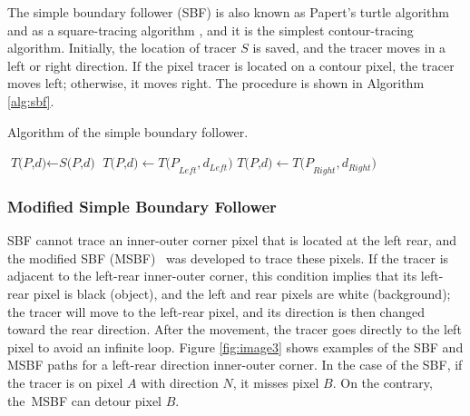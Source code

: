 \documentclass[sensors,article,accept,moreauthors,pdftex,10pt,a4paper]{mdpi}
\begin{document}
The simple boundary follower (SBF) is also known as Papert's turtle algorithm \cite{Papert1973Uses} and as a square-tracing algorithm \cite{Ghuneim2015Contour}, and it is the simplest contour-tracing algorithm. Initially, the location of tracer $S$ is saved, and the tracer moves in a left or right direction. If the pixel tracer is located on a contour pixel, the tracer moves left; otherwise, it moves right. The procedure is shown in Algorithm \ref{alg:sbf}.

\begin{algorithm}[H]
	\caption{Algorithm of the simple boundary follower.}\label{alg:sbf}
	\begin{algorithmic}[1]
	\begin{spacing}{1.5}
	\State $\textit{T(P,d)} \gets \textit{S(P,d)}$
	\Do
	\State $\textit{T(P,d)} \gets \textit{T(P}_{Left},\textit{d}_{Left} ) $
	\Else
	\State $\textit{T(P,d)} \gets \textit{T(P}_{Right},\textit{d}_{Right})$
	\EndIf
	\EndProcedure\vspace{-12pt}
	\end{spacing}
	\end{algorithmic}
\end{algorithm}

\subsubsection{Modified Simple Boundary Follower}


SBF cannot trace an inner-outer corner pixel that is located at the left rear, and the modified SBF (MSBF)~\cite{Gose1996Pattern} was developed to trace these pixels. If the tracer is adjacent to the left-rear inner-outer corner, this condition implies that its left-rear pixel is black (object), and the left and rear pixels are white (background); the tracer will move to the left-rear pixel, and its direction is then changed toward the rear direction. After the movement, the tracer goes directly to the left pixel to avoid an infinite loop. Figure \ref{fig:image3} shows examples of the SBF and MSBF paths for a left-rear direction inner-outer corner. In the case of the SBF, if the tracer is on pixel $A$ with direction $N$, it misses pixel $B$. On the contrary, the~MSBF can detour pixel $B$.
\end{document}
